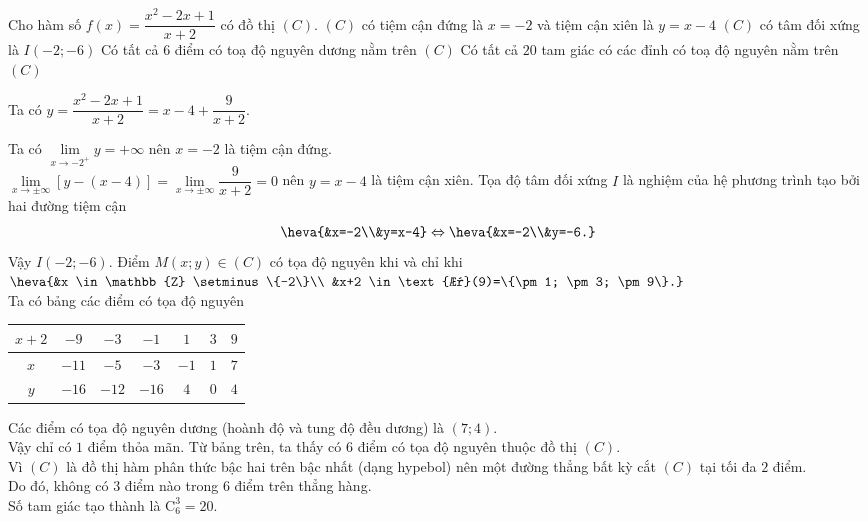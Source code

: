 \begin{ex}%
	Cho hàm số $f(x)=\dfrac{x^2-2x+1}{x+2}$ có đồ thị $(C)$.
	\choiceTF
	{\True $(C)$ có tiệm cận đứng là $x=-2$ và tiệm cận xiên là $y=x-4$}
	{\True $(C)$ có tâm đối xứng là $I(-2;-6)$}
	{Có tất cả $6$ điểm có toạ độ nguyên dương nằm trên $(C)$}
	{\True Có tất cả $20$ tam giác có các đỉnh có toạ độ nguyên nằm trên $(C)$}
	\loigiai
	{
		Ta có $y=\dfrac{x^2-2x+1}{x+2} = x-4 + \dfrac{9}{x+2}$.
		\begin{itemchoice}
			\itemch Ta có $\lim\limits_{x \to -2^+} y = +\infty$ nên $x=-2$ là tiệm cận đứng.\\
			$\lim\limits_{x \to \pm \infty} [y-(x-4)] = \lim\limits_{x \to \pm \infty} \dfrac{9}{x+2} = 0$ nên $y=x-4$ là tiệm cận xiên.
			\itemch Tọa độ tâm đối xứng $I$ là nghiệm của hệ phương trình tạo bởi hai đường tiệm cận
			\begin{eqnarray*}
				\heva{&x=-2\\&y=x-4} \Leftrightarrow \heva{&x=-2\\&y=-6.}
			\end{eqnarray*}
			Vậy $I(-2;-6)$.
			\itemch Điểm $M(x;y) \in (C)$ có tọa độ nguyên khi và chỉ khi
			$
			\heva{&x \in \mathbb{Z} \setminus \{-2\}\\ &x+2 \in \text{Ư}(9)=\{\pm 1; \pm 3; \pm 9\}.}
			$\\
			Ta có bảng các điểm có tọa độ nguyên
			\begin{center}
				\begin{tabular}{|c|c|c|c|c|c|c|}
					\hline
					$x+2$ & $-9$ & $-3$ & $-1$ & $1$ & $3$ & $9$ \\
					\hline
					$x$ & $-11$ & $-5$ & $-3$ & $-1$ & $1$ & $7$ \\
					\hline
					$y$ & $-16$ & $-12$ & $-16$ & $4$ & $0$ & $4$ \\
					\hline
				\end{tabular}
			\end{center}
			Các điểm có tọa độ nguyên dương (hoành độ và tung độ đều dương) là $(7;4)$.\\ Vậy chỉ có $1$ điểm thỏa mãn.
			\itemch Từ bảng trên, ta thấy có $6$ điểm có tọa độ nguyên thuộc đồ thị $(C)$.\\
			Vì $(C)$ là đồ thị hàm phân thức bậc hai trên bậc nhất (dạng hypebol) nên một đường thẳng bất kỳ cắt $(C)$ tại tối đa $2$ điểm.\\ Do đó, không có $3$ điểm nào trong $6$ điểm trên thẳng hàng.\\
			Số tam giác tạo thành là $\mathrm{C}_6^3 = 20$.
		\end{itemchoice}
	}
\end{ex}


